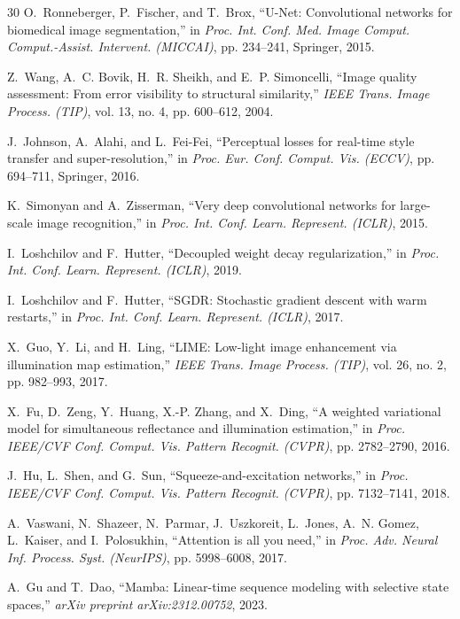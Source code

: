 \documentclass[journal,onecolumn,11pt]{IEEEtran}
\begin{document}
\begin{thebibliography}{30}
O.~Ronneberger, P.~Fischer, and T.~Brox, ``U-Net: Convolutional networks for biomedical image segmentation,'' in \emph{Proc. Int. Conf. Med. Image Comput. Comput.-Assist. Intervent. (MICCAI)}, pp. 234--241, Springer, 2015.

Z.~Wang, A.~C. Bovik, H.~R. Sheikh, and E.~P. Simoncelli, ``Image quality assessment: From error visibility to structural similarity,'' \emph{IEEE Trans. Image Process. (TIP)}, vol. 13, no. 4, pp. 600--612, 2004.

J.~Johnson, A.~Alahi, and L.~Fei-Fei, ``Perceptual losses for real-time style transfer and super-resolution,'' in \emph{Proc. Eur. Conf. Comput. Vis. (ECCV)}, pp. 694--711, Springer, 2016.

K.~Simonyan and A.~Zisserman, ``Very deep convolutional networks for large-scale image recognition,'' in \emph{Proc. Int. Conf. Learn. Represent. (ICLR)}, 2015.

I.~Loshchilov and F.~Hutter, ``Decoupled weight decay regularization,'' in \emph{Proc. Int. Conf. Learn. Represent. (ICLR)}, 2019.

I.~Loshchilov and F.~Hutter, ``SGDR: Stochastic gradient descent with warm restarts,'' in \emph{Proc. Int. Conf. Learn. Represent. (ICLR)}, 2017.

X.~Guo, Y.~Li, and H.~Ling, ``LIME: Low-light image enhancement via illumination map estimation,'' \emph{IEEE Trans. Image Process. (TIP)}, vol. 26, no. 2, pp. 982--993, 2017.

X.~Fu, D.~Zeng, Y.~Huang, X.-P. Zhang, and X.~Ding, ``A weighted variational model for simultaneous reflectance and illumination estimation,'' in \emph{Proc. IEEE/CVF Conf. Comput. Vis. Pattern Recognit. (CVPR)}, pp. 2782--2790, 2016.

J.~Hu, L.~Shen, and G.~Sun, ``Squeeze-and-excitation networks,'' in \emph{Proc. IEEE/CVF Conf. Comput. Vis. Pattern Recognit. (CVPR)}, pp. 7132--7141, 2018.

A.~Vaswani, N.~Shazeer, N.~Parmar, J.~Uszkoreit, L.~Jones, A.~N. Gomez, L.~Kaiser, and I.~Polosukhin, ``Attention is all you need,'' in \emph{Proc. Adv. Neural Inf. Process. Syst. (NeurIPS)}, pp. 5998--6008, 2017.

A.~Gu and T.~Dao, ``Mamba: Linear-time sequence modeling with selective state spaces,'' \emph{arXiv preprint arXiv:2312.00752}, 2023.


\end{thebibliography}
\end{document}
